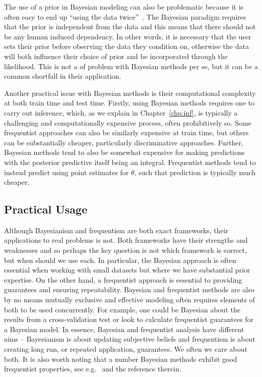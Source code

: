 The use of a prior in Bayesian modeling can also be problematic because it is often easy to end up 
``using the data twice''~\citep{gelman2008objections}.  The Bayesian paradigm requires that the
prior is independent from the data and this means that there should not be any human induced
dependency.  In other words, it is necessary that the user sets their prior before
observing the data they condition on, otherwise the data will both influence their choice of prior
and be incorporated through the likelihood.  This is not a of problem with Bayesian 
methods per se, but it can be a common shortfall in their application.

Another practical issue with Bayesian methods is their computational complexity at both
train time and test time.  Firstly, using Bayesian methods requires one to carry out inference,
which, as we explain in Chapter~\ref{chp:inf}, is typically a challenging and computationally
expensive process, often prohibitively so.  Some frequentist approaches can also
be similarly expensive at train time, but others can be substantially cheaper, particularly
discriminative approaches.  Further, Bayesian methods tend to also be somewhat expensive
for making predictions with the posterior predictive itself being an integral.  Frequentist
methods tend to instead predict using point estimates for $\theta$, such that prediction is typically
much cheaper.

\subsection{Practical Usage}
\label{sec:bayes:religion:correct}

Although Bayesianism and frequentism are both exact frameworks, their applications to real problems is not.
Both frameworks have their strengths and weaknesses and so perhaps the key question is not which framework
is correct, but when should we use each.  In
particular, the Bayesian approach is often essential when working with small datasets but where we have substantial
prior expertise.  On the other hand, a frequentist approach is essential to providing guarantees and ensuring repeatability.  
Bayesian and frequentist methods are also by no means mutually 
exclusive and effective modeling often requires elements of both
to be used concurrently.  
For example, one could be Bayesian about the results from a cross-validation test or look to calculate
frequentist guarantees for a Bayesian model.
In essence, Bayesian and frequentist analysis have different aims -- Bayesianism is about updating
subjective beliefs and frequentism is about creating long run, or repeated application, guarantees.
We often we care about both.  It is also worth noting that a number Bayesian methods exhibit
good frequentist properties, see e.g.~\cite{mcallester2013pac} and the reference therein.

